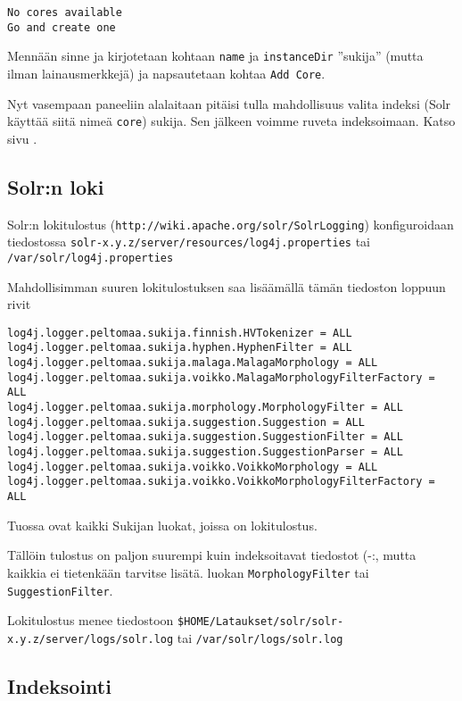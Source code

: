 \documentclass[12pt]{article}
\begin{document}
\begin{verbatim}
No cores available
Go and create one
\end{verbatim}

Mennään sinne ja kirjotetaan kohtaan \verb=name= ja \verb=instanceDir=
''sukija'' (mutta ilman lainausmerkkejä) ja napsautetaan kohtaa
\verb=Add Core=.

Nyt vasempaan paneeliin alalaitaan pitäisi tulla mahdollisuus valita
indeksi (Solr käyttää siitä nimeä \verb=core=) sukija. Sen jälkeen
voimme ruveta indeksoimaan. Katso sivu .


\subsection*{Solr:n loki}

Solr:n lokitulostus (\verb=http://wiki.apache.org/solr/SolrLogging=)
konfiguroidaan tiedostossa
\verb=solr-x.y.z/server/resources/log4j.properties= tai
\verb=/var/solr/log4j.properties=

Mahdollisimman suuren lokitulostuksen saa lisäämällä tämän tiedoston
loppuun rivit


{\footnotesize
\begin{verbatim}
log4j.logger.peltomaa.sukija.finnish.HVTokenizer = ALL
log4j.logger.peltomaa.sukija.hyphen.HyphenFilter = ALL
log4j.logger.peltomaa.sukija.malaga.MalagaMorphology = ALL
log4j.logger.peltomaa.sukija.voikko.MalagaMorphologyFilterFactory = ALL
log4j.logger.peltomaa.sukija.morphology.MorphologyFilter = ALL
log4j.logger.peltomaa.sukija.suggestion.Suggestion = ALL
log4j.logger.peltomaa.sukija.suggestion.SuggestionFilter = ALL
log4j.logger.peltomaa.sukija.suggestion.SuggestionParser = ALL
log4j.logger.peltomaa.sukija.voikko.VoikkoMorphology = ALL
log4j.logger.peltomaa.sukija.voikko.VoikkoMorphologyFilterFactory = ALL
\end{verbatim}
}

Tuossa ovat kaikki Sukijan luokat, joissa on lokitulostus.

Tällöin tulostus on paljon suurempi kuin indeksoitavat tiedostot (-:,
mutta kaikkia ei tietenkään tarvitse lisätä.
luokan \verb=MorphologyFilter= tai \verb=SuggestionFilter=.

Lokitulostus menee tiedostoon
\verb=$HOME/Lataukset/solr/solr-x.y.z/server/logs/solr.log= tai
\verb=/var/solr/logs/solr.log=


\subsection*{Indeksointi}
\end{document}
